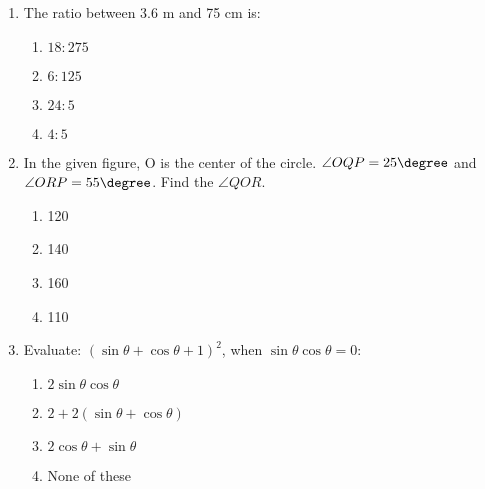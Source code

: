 \begin{enumerate}[label=(\roman*)]
    \item The ratio between 3.6 m and 75 cm is:

        \begin{multicols}{2}
        \begin{enumerate}[label=(\alph*)]
            \item $18 : 275$
            \item $6 : 125$
            \item $24 : 5$
            \item $4 : 5$
        \end{enumerate}
        \end{multicols}

    \item In the given figure, O is the center of the circle. 
        $\angle OQP = 25\degree$ and $\angle ORP = 55\degree$. Find the 
        $\angle QOR$.


        \begin{multicols}{2}
        \begin{enumerate}[label=(\alph*)]
            \item 120\degree
            \item 140\degree
            \item 160\degree
            \item 110\degree
        \end{enumerate}
        \end{multicols}

    \item Evaluate: $(\sin \theta + \cos \theta + 1)^2$, when $\sin \theta \cos \theta = 0$:

        \begin{multicols}{2}
        \begin{enumerate}[label=(\alph*)]
            \item $2 \sin \theta \cos \theta$
            \item $2 + 2(\sin \theta + \cos \theta)$
            \item $2 \cos \theta + \sin \theta$
            \item None of these
        \end{enumerate}
        \end{multicols}


\end{enumerate}
